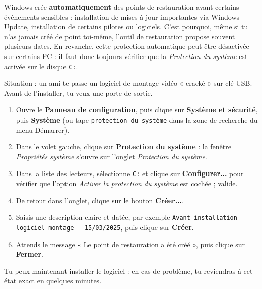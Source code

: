 \documentclass[11pt]{article}
\begin{document}
\begin{savaistu}
Windows crée \textbf{automatiquement} des points de restauration avant certains événements sensibles : installation de mises à jour importantes via Windows Update, installation de certains pilotes ou logiciels. C'est pourquoi, même si tu n'as jamais créé de point toi-même, l'outil de restauration propose souvent plusieurs dates. En revanche, cette protection automatique peut être désactivée sur certains PC : il faut donc toujours vérifier que la \emph{Protection du système} est activée sur le disque \texttt{C:}.
\end{savaistu}

\begin{methode}
Situation : un ami te passe un logiciel de montage vidéo « cracké » sur clé USB. Avant de l'installer, tu veux une porte de sortie.
\begin{enumerate}
\item Ouvre le \textbf{Panneau de configuration}, puis clique sur \textbf{Système et sécurité}, puis \textbf{Système} (ou tape \texttt{protection du système} dans la zone de recherche du menu Démarrer).
\item Dans le volet gauche, clique sur \textbf{Protection du système} : la fenêtre \emph{Propriétés système} s'ouvre sur l'onglet \emph{Protection du système}.
\item Dans la liste des lecteurs, sélectionne \texttt{C:} et clique sur \textbf{Configurer...} pour vérifier que l'option \emph{Activer la protection du système} est cochée ; valide.
\item De retour dans l'onglet, clique sur le bouton \textbf{Créer...}.
\item Saisis une description claire et datée, par exemple \texttt{Avant installation logiciel montage - 15/03/2025}, puis clique sur \textbf{Créer}.
\item Attends le message « Le point de restauration a été créé », puis clique sur \textbf{Fermer}.
\end{enumerate}
Tu peux maintenant installer le logiciel : en cas de problème, tu reviendras à cet état exact en quelques minutes.
\end{methode}
\end{document}
